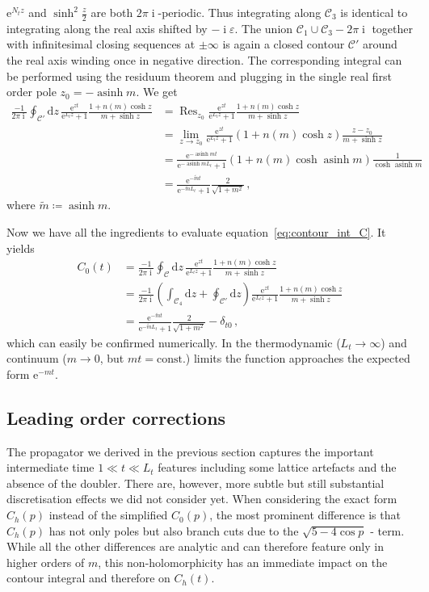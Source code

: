 \documentclass[a4paper]{article}
\DeclareMathOperator{\im}{i}
\DeclareMathOperator{\res}{Res}
\DeclareMathOperator{\asinh}{asinh}
\newcommand{\eto}[1]{\ensuremath{\mathrm{e}^{#1}}}
\newcommand{\md}{\ensuremath{\mathrm{d}}}
\begin{document}
	$\eto{N_t z}$ and $\sinh^2\frac z2$ are both $2\pi\im$-periodic. Thus integrating along $\mathcal{C}_3$ is identical to integrating along the real axis shifted by $-\im\varepsilon$. The union $\mathcal{C}_1 \cup \mathcal{C}_3-2\pi\im$ together with infinitesimal closing sequences at $\pm\infty$ is again a closed contour $\mathcal{C'}$ around the real axis winding once in negative direction. The corresponding integral can be performed using the residuum theorem and plugging in the single real first order pole $z_0=-\asinh m$. We get
	\begin{align}
	\frac{-1}{2\pi\im}\oint_{\mathcal{C'}}\md z\, \frac{\eto{z t}}{\eto{L_t z}+1}\frac{1+n(m)\cosh z}{m+\sinh z}
	&=\res_{z_0}\frac{\eto{z t}}{\eto{L_t z}+1}\frac{1+n(m)\cosh z}{m+\sinh z}\\
	&=\lim_{z\rightarrow z_0}\frac{\eto{z t}}{\eto{L_t z}+1}\left(1+n(m)\cosh z\right)\frac{z-z_0}{m+\sinh z}\\
	&= \frac{\eto{-\asinh m t}}{\eto{-\asinh m L_t}+1}\left(1+n(m)\cosh\asinh m\right)\frac{1}{\cosh\asinh m}\\
	&= \frac{\eto{-\tilde m t}}{\eto{-\tilde m L_t}+1}\frac{2}{\sqrt{1+m^2}}\,,
	\end{align}
	where $\tilde m\coloneqq \asinh m$.
	
	Now we have all the ingredients to evaluate equation~\eqref{eq:contour_int_C}. It yields
	\begin{align}
		C_0(t) &=
	\frac{-1}{2\pi\im}\oint_\mathcal{C}\md z\, \frac{\eto{z t}}{\eto{L_t z}+1}\frac{1+n(m)\cosh z}{m+\sinh z}\\
	&=\frac{-1}{2\pi\im}\left(\int_{\mathcal{C}_4}\md z+\oint_\mathcal{C'}\md z\right) \frac{\eto{z t}}{\eto{L_t z}+1}\frac{1+n(m)\cosh z}{m+\sinh z}\\
	&=\frac{\eto{-\tilde m t}}{\eto{-\tilde m L_t}+1}\frac{2}{\sqrt{1+m^2}}-\delta_{t0}\,,
	\end{align}
	which can easily be confirmed numerically. In the thermodynamic ($L_t\rightarrow\infty$) and continuum ($m\rightarrow0$, but $mt=\text{const.}$) limits the function approaches the expected form $\eto{-m t}$.

	\subsection{Leading order corrections}
	The propagator we derived in the previous section captures the important intermediate time $1\ll t \ll L_t$ features including some lattice artefacts and the absence of the doubler. There are, however, more subtle but still substantial discretisation effects we did not consider yet. When considering the exact form $C_h(p)$ instead of the simplified $C_0(p)$, the most prominent difference is that $C_h(p)$ has not only poles but also branch cuts due to the $\sqrt{5-4\cos p}$ - term. While all the other differences are analytic and can therefore feature only in higher orders of $m$, this non-holomorphicity has an immediate impact on the contour integral and therefore on $C_h(t)$.
	
\end{document}
